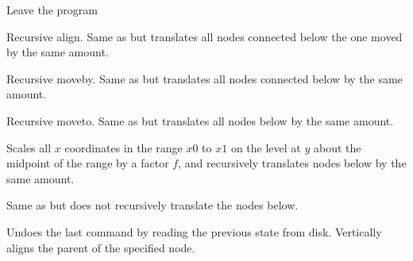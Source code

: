 Leave the program

Recursive align.  Same as  but translates all nodes connected below
the one moved by the same amount.

Recursive moveby.  Same as  but translates all nodes connected below
by the same amount.

Recursive moveto.  Same as  but translates all nodes below by the
same amount.

Scales all $x$ coordinates in the range $x0$ to $x1$ on the level at $y$ about the
midpoint of the range by a factor $f$, and recursively translates nodes below
by the same amount.

Same as  but does not recursively translate the nodes below.

 Undoes the last command by reading the previous state from disk.
 Vertically aligns the parent of the specified node.




\clearpage
{}
{} %

\cleardoublepage
{}
{}


%







